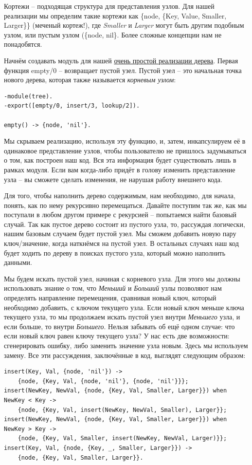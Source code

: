 \documentclass[a4paper,12pt]{report}
\newcommand{\ops}{\colorbox{lgreen}}
\begin{document}
Кортежи \--- подходящая структура для представления узлов. Для нашей реализации мы определим такие кортежи как \ops{\{node, \{Key, Value, Smaller, Larger\}\}} (меченый кортеж!), где \emph{Smaller} и \emph{Larger} могут быть другим подобным узлом, или пустым узлом (\ops{\{node, nil\}}. Более сложные концепции нам не понадобятся.

Начнём создавать модуль для нашей \href{http://learnyousomeerlang.com/static/erlang/tree.erl}{очень простой реализации дерева}. Первая функция \ops{empty/0} \--- возвращает пустой узел. Пустой узел \--- это начальная точка нового дерева, которая также называется \emph{корневым узлом}:
\begin{lstlisting}[style=erlang]
-module(tree).
-export([empty/0, insert/3, lookup/2]).
 
empty() -> {node, 'nil'}.
\end{lstlisting}

Мы скрываем реализацию, используя эту функцию, и, затем, инкапсулируем её в одинаковое представление узлов, чтобы пользователю не пришлось задумываться о том, как построен наш код. Вся эта информация будет существовать лишь в рамках модуля. Если вам когда\--либо придёт в голову изменить представление узла \--- вы сможете сделать изменения, не нарушая работу внешнего кода.

Для того, чтобы наполнить дерево содержимым, нам необходимо, для начала, понять, как по нему рекурсивно перемещаться. Давайте поступим так же, как мы поступали в любом другом примере с рекурсией \--- попытаемся найти базовый случай. Так как пустое дерево состоит из пустого узла, то, рассуждая логически, нашим базовым случаем будет пустой узел. Мы сможем добавить новую пару ключ/значение, когда наткнёмся на пустой узел. В остальных случаях наш код будет ходить по дереву в поисках пустого узла, который можно наполнить данными.

Мы будем искать пустой узел, начиная с корневого узла. Для этого мы должны использовать знание о том, что \emph{Меньший} и \emph{Больший} узлы позволяют нам определять направление перемещения, сравнивая новый ключ, который необходимо добавить, с ключом текущего узла. Если новый ключ меньше ключа текущего узла, то мы продолжаем искать пустой узел внутри \emph{Меньшего} узла, и если больше, то внутри \emph{Большего}. Нельзя забывать об ещё одном случае: что если новый ключ равен ключу текущего узла? У нас есть две возможности: сгенерировать ошибку, либо заменить значение узла новым. Здесь мы используем замену. Все эти рассуждения, заключённые в код, выглядят следующим образом:
\begin{lstlisting}[style=erlang]
insert(Key, Val, {node, 'nil'}) ->
    {node, {Key, Val, {node, 'nil'}, {node, 'nil'}}};
insert(NewKey, NewVal, {node, {Key, Val, Smaller, Larger}}) when NewKey < Key ->
    {node, {Key, Val, insert(NewKey, NewVal, Smaller), Larger}};
insert(NewKey, NewVal, {node, {Key, Val, Smaller, Larger}}) when NewKey > Key ->
    {node, {Key, Val, Smaller, insert(NewKey, NewVal, Larger)}};
insert(Key, Val, {node, {Key, _, Smaller, Larger}}) ->
    {node, {Key, Val, Smaller, Larger}}.
\end{lstlisting}
\end{document}
